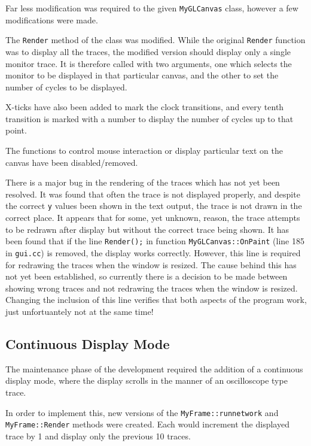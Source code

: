 \documentclass[a4paper,10pt]{article}  %
\begin{document}
Far less modification was required to the given \texttt{MyGLCanvas}
class, however a few modifications were made.

The \texttt{Render} method of the class was modified. While the
original \texttt{Render} function was to display all the traces, the
modified version should display only a single monitor trace. It is
therefore called with two arguments, one which selects the monitor to
be displayed in that particular canvas, and the other to set the
number of cycles to be displayed.

X-ticks have also been added to mark the clock transitions, and every
tenth transition is marked with a number to display the number of
cycles up to that point.

The functions to control mouse interaction or display particular text
on the canvas have been disabled/removed.

There is a major bug in the rendering of the traces
which has not yet been resolved. It was found that often the trace is
not displayed properly, and despite the correct \texttt{y} values been
shown in the text output, the trace is not drawn in the correct
place. It appears that for some, yet unknown, reason, the trace
attempts to be redrawn after display but without the correct trace
being shown. It has been found that if the line \texttt{Render();} in
function \texttt{MyGLCanvas::OnPaint} (line 185 in \texttt{gui.cc}) is
removed, the display works correctly. However, this line is required
for redrawing the traces when the window is resized. The cause behind
this has not yet been established, so currently there is a decision to
be made between showing wrong traces and not redrawing the traces when
the window is resized. Changing the inclusion of this line verifies
that both aspects of the program work, just unfortuantely not at the
same time!

\subsection{Continuous Display Mode}

The maintenance phase of the development required the addition of a
continuous display mode, where the display scrolls in the manner of an
oscilloscope type trace.

In order to implement this, new versions of the \texttt{MyFrame::runnetwork}
and \texttt{MyFrame::Render} methods were created. Each would
increment the displayed trace by 1 and display only the previous 10
traces.
\end{document}
